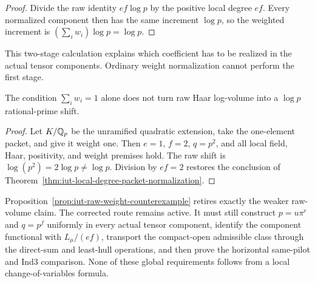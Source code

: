 \begin{proof}
Divide the raw identity $ef\log p$ by the positive local degree $ef$.
Every normalized component then has the same increment $\log p$, so the
weighted increment is $(\sum_iw_i)\log p=\log p$.
\end{proof}

This two-stage calculation explains which coefficient has to be realized in
the actual tensor components.  Ordinary weight normalization cannot perform
the first stage.

\begin{proposition}
\label{prop:iut-raw-weight-counterexample}
The condition $\sum_iw_i=1$ alone does not turn raw Haar log-volume into a
$\log p$ rational-prime shift.
\end{proposition}

\begin{proof}
Let $K/\mathbb Q_p$ be the unramified quadratic extension, take the one-element
packet, and give it weight one.  Then $e=1$, $f=2$, $q=p^2$, and all local
field, Haar, positivity, and weight premises hold.  The raw shift is
$\log(p^2)=2\log p\ne\log p$.  Division by $ef=2$ restores the conclusion
of Theorem~\ref{thm:iut-local-degree-packet-normalization}.
\end{proof}

Proposition~\ref{prop:iut-raw-weight-counterexample} retires exactly the
weaker raw-volume claim.  The corrected route remains active.  It must still
construct $p=u\pi^e$ and $q=p^f$ uniformly in every actual tensor component,
identify the component functional with $L_\mu/(ef)$, transport the
compact-open admissible class through the direct-sum and least-hull
operations, and then prove the horizontal same-pilot and Ind3 comparison.
None of these global requirements follows from a local change-of-variables
formula.
